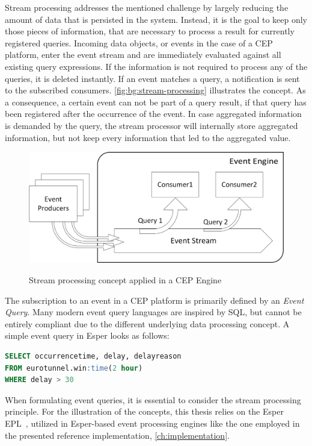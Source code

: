 Stream processing addresses the mentioned challenge by largely reducing the amount of data that is persisted in the system. Instead, it is the goal to keep only those pieces of information, that are necessary to process a result for currently registered queries.
Incoming data objects, or events in the case of a CEP platform, enter the event stream and are immediately evaluated against all existing query expressions. If the information is not required to process any of the queries, it is deleted instantly. If an event matches a query, a notification is sent to the subscribed consumers. \autoref{fig:bg:stream-processing} illustrates the concept.
As a consequence, a certain event can not be part of a query result, if that query has been registered after the occurrence of the event.
In case aggregated information is demanded by the query, the stream processor will internally store aggregated information, but not keep every information that led to the aggregated value.~\cite{streamprocessing} 

\begin{figure}[]
	\myfloatalign
	{\includegraphics[width=0.7\linewidth]{chapters/background/cep-stream-processing.png}}
	\caption{Stream processing concept applied in a CEP Engine}
	\label{fig:bg:stream-processing}
\end{figure}

The subscription to an event in a CEP platform is primarily defined by an \textit{Event Query}.
Many modern event query languages are inspired by \acs{SQL}, but cannot be entirely compliant due to the different underlying data processing concept. A simple event query in Esper looks as follows:

\begin{lstlisting}[language=sql,caption={Sample Query in Esper EPL},label=lst:epl-query-example]
SELECT occurrencetime, delay, delayreason 
FROM eurotunnel.win:time(2 hour)
WHERE delay > 30
\end{lstlisting}

When formulating event queries, it is essential to consider the stream processing principle.
For the illustration of the concepts, this thesis relies on the Esper \ac{EPL}~\cite{esperhome}, utilized in Esper-based event processing engines like the one employed in the presented reference implementation, \autoref{ch:implementation}.


